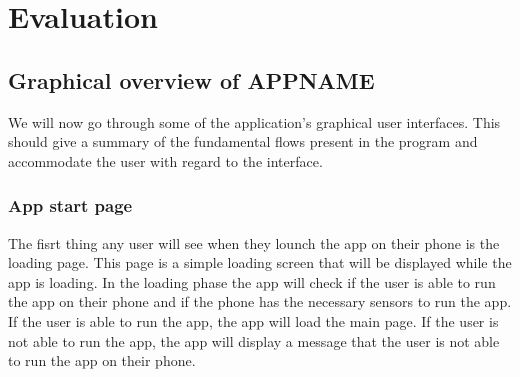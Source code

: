 \chapter{Evaluation}\label{cap:evaluation}
\section{Graphical overview of APPNAME}
We will now go through some of the application's graphical user interfaces. This should give a summary of the fundamental flows present in the program and accommodate the user with regard to the interface.
\pagebreak

\subsection{App start page}
The fisrt thing any user will see when they lounch the app on their phone is the loading page. This page is a simple loading screen that will be displayed while the app is loading. In the loading phase the app will check if the user is able to run the app on their phone and if the phone has the necessary sensors to run the app. If the user is able to run the app, the app will load the main page. If the user is not able to run the app, the app will display a message that the user is not able to run the app on their phone.
